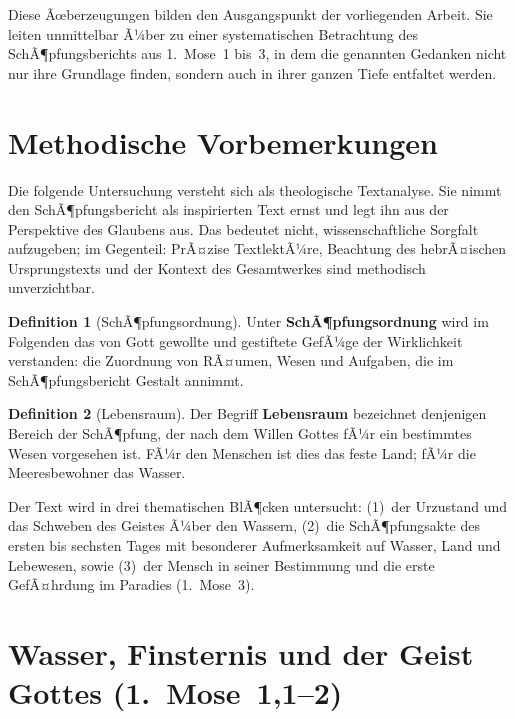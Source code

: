 ﻿\documentclass[a4paper,12pt]{article}
\theoremstyle{definition}
\newtheorem{definition}{Definition}[section]
\begin{document}
Diese Ãœberzeugungen bilden den Ausgangspunkt der vorliegenden Arbeit. Sie leiten
unmittelbar Ã¼ber zu einer systematischen Betrachtung des SchÃ¶pfungsberichts aus
1.~Mose~1 bis~3, in dem die genannten Gedanken nicht nur ihre Grundlage finden,
sondern auch in ihrer ganzen Tiefe entfaltet werden.

\section{Methodische Vorbemerkungen}

Die folgende Untersuchung versteht sich als theologische Textanalyse. Sie nimmt den
SchÃ¶pfungsbericht als inspirierten Text ernst und legt ihn aus der Perspektive des
Glaubens aus. Das bedeutet nicht, wissenschaftliche Sorgfalt aufzugeben; im
Gegenteil: PrÃ¤zise TextlektÃ¼re, Beachtung des hebrÃ¤ischen Ursprungstexts und der
Kontext des Gesamtwerkes sind methodisch unverzichtbar.

\begin{definition}[SchÃ¶pfungsordnung]
    Unter \textbf{SchÃ¶pfungsordnung} wird im Folgenden das von Gott gewollte und
    gestiftete GefÃ¼ge der Wirklichkeit verstanden: die Zuordnung von RÃ¤umen, Wesen
    und Aufgaben, die im SchÃ¶pfungsbericht Gestalt annimmt.
\end{definition}

\begin{definition}[Lebensraum]
    Der Begriff \textbf{Lebensraum} bezeichnet denjenigen Bereich der SchÃ¶pfung,
    der nach dem Willen Gottes fÃ¼r ein bestimmtes Wesen vorgesehen ist. FÃ¼r den
    Menschen ist dies das feste Land; fÃ¼r die Meeresbewohner das Wasser.
\end{definition}

Der Text wird in drei thematischen BlÃ¶cken untersucht: (1)~der Urzustand und das
Schweben des Geistes Ã¼ber den Wassern, (2)~die SchÃ¶pfungsakte des ersten bis
sechsten Tages mit besonderer Aufmerksamkeit auf Wasser, Land und Lebewesen,
sowie (3)~der Mensch in seiner Bestimmung und die erste GefÃ¤hrdung im Paradies
(1.~Mose~3).

\section{Wasser, Finsternis und der Geist Gottes (1.~Mose~1,1--2)}
\end{document}
